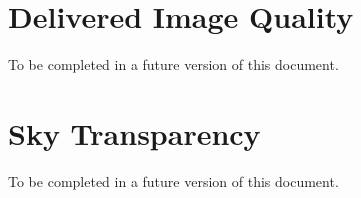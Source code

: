\documentclass[12pt]{article}
\begin{document}
\section{Delivered Image Quality}

To be completed in a future version of this document.

\section{Sky Transparency}

To be completed in a future version of this document.



\end{document}
